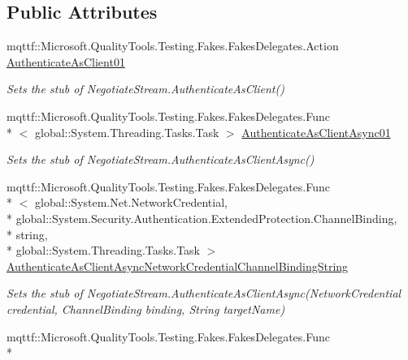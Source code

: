 \subsection*{Public Attributes}
\begin{DoxyCompactItemize}
\item 
mqttf\-::\-Microsoft.\-Quality\-Tools.\-Testing.\-Fakes.\-Fakes\-Delegates.\-Action \hyperlink{class_system_1_1_net_1_1_security_1_1_fakes_1_1_stub_negotiate_stream_a54b44bea7128aa3494b43d00f7f7abd8}{Authenticate\-As\-Client01}
\begin{DoxyCompactList}\small\item\em Sets the stub of Negotiate\-Stream.\-Authenticate\-As\-Client()\end{DoxyCompactList}\item 
mqttf\-::\-Microsoft.\-Quality\-Tools.\-Testing.\-Fakes.\-Fakes\-Delegates.\-Func\\*
$<$ global\-::\-System.\-Threading.\-Tasks.\-Task $>$ \hyperlink{class_system_1_1_net_1_1_security_1_1_fakes_1_1_stub_negotiate_stream_abe8d4d20d6d5aeac9bffea28135ec31c}{Authenticate\-As\-Client\-Async01}
\begin{DoxyCompactList}\small\item\em Sets the stub of Negotiate\-Stream.\-Authenticate\-As\-Client\-Async()\end{DoxyCompactList}\item 
mqttf\-::\-Microsoft.\-Quality\-Tools.\-Testing.\-Fakes.\-Fakes\-Delegates.\-Func\\*
$<$ global\-::\-System.\-Net.\-Network\-Credential, \\*
global\-::\-System.\-Security.\-Authentication.\-Extended\-Protection.\-Channel\-Binding, \\*
string, \\*
global\-::\-System.\-Threading.\-Tasks.\-Task $>$ \hyperlink{class_system_1_1_net_1_1_security_1_1_fakes_1_1_stub_negotiate_stream_af793479ab248b1e565e43f0ea5341306}{Authenticate\-As\-Client\-Async\-Network\-Credential\-Channel\-Binding\-String}
\begin{DoxyCompactList}\small\item\em Sets the stub of Negotiate\-Stream.\-Authenticate\-As\-Client\-Async(\-Network\-Credential credential, Channel\-Binding binding, String target\-Name)\end{DoxyCompactList}\item 
mqttf\-::\-Microsoft.\-Quality\-Tools.\-Testing.\-Fakes.\-Fakes\-Delegates.\-Func\\*

\end{DoxyCompactItemize}
